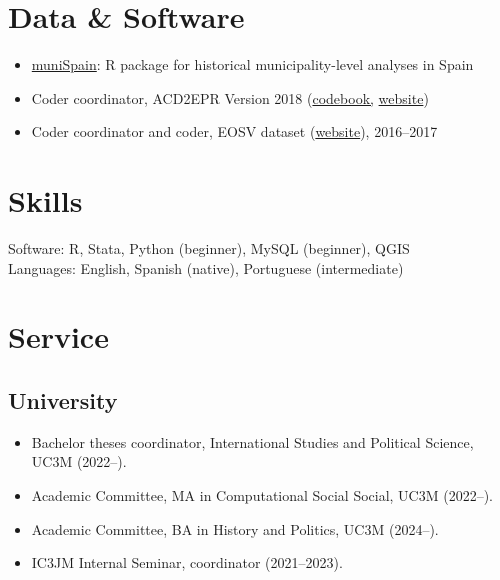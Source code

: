 \documentclass[a4paper, 12pt]{article}
\begin{document}
\section*{Data \& Software}

\begin{itemize}[leftmargin=*, nolistsep]
  \item \href{https://github.com/franvillamil/muniSpain}{muniSpain}: R package for historical municipality-level analyses in Spain
	\item Coder coordinator, ACD2EPR Version 2018 (\href{https://icr.ethz.ch/data/epr/acd2epr/ACD2EPR-2018_Codebook.pdf}{codebook,} \href{https://icr.ethz.ch/data/epr/acd2epr/}{website})
	\item Coder coordinator and coder, EOSV dataset (\href{https://snis.ch/project/civilian-victimization-conflict-escalation/}{website}), 2016--2017
\end{itemize}

\section*{Skills}

Software: R, Stata, Python (beginner), MySQL (beginner), QGIS\\
Languages: English, Spanish (native), Portuguese (intermediate)

\section*{Service}

\subsection*{University}

\begin{itemize}[leftmargin=*, nolistsep]
  \item Bachelor theses coordinator, International Studies and Political Science, UC3M (2022--).
	\item Academic Committee, MA in Computational Social Social, UC3M (2022--).
	\item Academic Committee, BA in History and Politics, UC3M (2024--).
	\item IC3JM Internal Seminar, coordinator (2021--2023).
\end{itemize}
\end{document}
